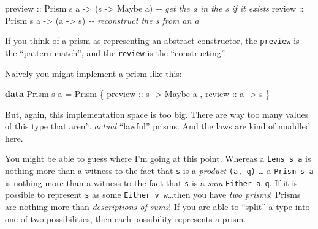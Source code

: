 \documentclass[]{article}
\newenvironment{Shaded}{}{}
\newcommand{\CommentTok}[1]{\textcolor[rgb]{0.38,0.63,0.69}{\textit{#1}}}
\newcommand{\DataTypeTok}[1]{\textcolor[rgb]{0.56,0.13,0.00}{#1}}
\newcommand{\KeywordTok}[1]{\textcolor[rgb]{0.00,0.44,0.13}{\textbf{#1}}}
\newcommand{\NormalTok}[1]{#1}
\newcommand{\OtherTok}[1]{\textcolor[rgb]{0.00,0.44,0.13}{#1}}
\begin{document}
\begin{Shaded}
\begin{Highlighting}[]
\OtherTok{preview ::} \DataTypeTok{Prism\textquotesingle{}}\NormalTok{ s a }\OtherTok{{-}\textgreater{}}\NormalTok{ (s }\OtherTok{{-}\textgreater{}} \DataTypeTok{Maybe}\NormalTok{ a)   }\CommentTok{{-}{-} get the \textquotesingle{}a\textquotesingle{} in the \textquotesingle{}s\textquotesingle{} if it exists}
\OtherTok{review  ::} \DataTypeTok{Prism\textquotesingle{}}\NormalTok{ s a }\OtherTok{{-}\textgreater{}}\NormalTok{ (a }\OtherTok{{-}\textgreater{}}\NormalTok{ s)         }\CommentTok{{-}{-} reconstruct the \textquotesingle{}s\textquotesingle{} from an \textquotesingle{}a\textquotesingle{}}
\end{Highlighting}
\end{Shaded}

If you think of a prism as representing an abstract constructor, the
\texttt{preview} is the ``pattern match'', and the \texttt{review} is the
``constructing''.

Naively you might implement a prism like this:

\begin{Shaded}
\begin{Highlighting}[]
\KeywordTok{data} \DataTypeTok{Prism\textquotesingle{}}\NormalTok{ s a }\OtherTok{=} \DataTypeTok{Prism\textquotesingle{}}
\NormalTok{    \{}\OtherTok{ preview ::}\NormalTok{ s }\OtherTok{{-}\textgreater{}} \DataTypeTok{Maybe}\NormalTok{ a}
\NormalTok{    ,}\OtherTok{ review  ::}\NormalTok{ a }\OtherTok{{-}\textgreater{}}\NormalTok{ s}
\NormalTok{    \}}
\end{Highlighting}
\end{Shaded}

But, again, this implementation space is too big. There are way too many values
of this type that aren't \emph{actual} ``lawful'' prisms. And the laws are kind
of muddled here.

You might be able to guess where I'm going at this point. Whereas a
\texttt{Lens\textquotesingle{}\ s\ a} is nothing more than a witness to the fact
that \texttt{s} is a \emph{product} \texttt{(a,\ q)} \ldots{} a
\texttt{Prism\textquotesingle{}\ s\ a} is nothing more than a witness to the
fact that \texttt{s} is a \emph{sum} \texttt{Either\ a\ q}. If it is possible to
represent \texttt{s} as some \texttt{Either\ v\ w}\ldots then you have \emph{two
prisms}! Prisms are nothing more than \emph{descriptions of sums}! If you are
able to ``split'' a type into one of two possibilities, then each possibility
represents a prism.
\end{document}
